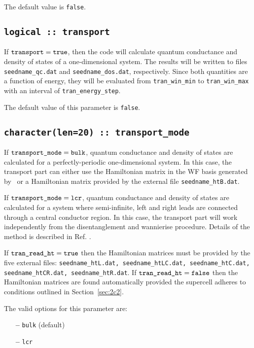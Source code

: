 The default value is {\tt false}.


\subsection[transport]{\tt logical :: transport}

If $\verb#transport#=\verb#true#$, then the code will calculate
quantum conductance and density of states of a one-dimensional system.
The results will be written to files \verb#seedname_qc.dat#
and \verb#seedname_dos.dat#, respectively.
Since both quantities are a function of energy,
they will be evaluated from \verb#tran_win_min# to \verb#tran_win_max#
with an interval of \verb#tran_energy_step#.

The default value of this parameter is \verb#false#.

\subsection[transport\_mode]{\tt character(len=20) :: transport\_mode}

If $\verb#transport_mode#=\verb#bulk#$, quantum conductance
and density of states are calculated for a perfectly-periodic one-dimensional system.
In this case, the transport part can either use 
the Hamiltonian matrix in the WF basis generated by \wannier\
or a Hamiltonian matrix provided by the external file
{\tt seedname\_htB.dat}.

If $\verb#transport_mode#=\verb#lcr#$, quantum conductance and density
of states are calculated for a system where semi-infinite, left and
right leads are connected through a central conductor region.  In this
case, the transport part will work independently from the
disentanglement and wannierise procedure.  Details of the method is
described in Ref. \cite{nardelli-prb99}.

If $\verb#tran_read_ht# = \verb#true#$ then the
Hamiltonian matrices must be provided by
the five external files:
{\tt seedname\_htL.dat, seedname\_htLC.dat, seedname\_htC.dat,
seedname\_htCR.dat, seedname\_htR.dat}.
If $\verb#tran_read_ht# = \verb#false#$ then the Hamiltonian
matrices are found automatically provided the supercell adheres to 
conditions outlined in Section~\ref{sec:2c2}.

The valid options for this parameter are:
\begin{itemize}
\item[{\bf --}] \verb#bulk#  (default)
\item[{\bf --}] \verb#lcr# 
\end{itemize}


